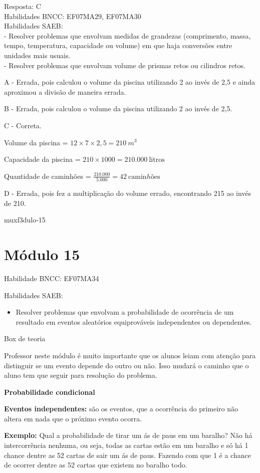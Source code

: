 {Resposta: C\\
Habilidades BNCC: EF07MA29, EF07MA30\\
Habilidades SAEB:\\
- Resolver problemas que envolvam medidas de grandezas (comprimento,
massa, tempo, temperatura, capacidade ou volume) em que haja conversões
entre unidades mais usuais.\\
- Resolver problemas que envolvam volume de prismas retos ou cilindros
retos.

A - Errada, pois calculou o volume da piscina utilizando 2 ao invés de
2,5 e ainda aproximou a divisão de maneira errada.

B - Errada, pois calculou o volume da piscina utilizando 2 ao invés de
2,5.

C - Correta.

Volume da piscina = \(12 \times 7 \times 2,5 = 210\ m^{3}\ \)

Capacidade da piscina = \(210 \times 1000 = 210.000\ \text{litros}\)

Quantidade de caminhões =
\(\frac{210.000}{5.000} = 42\ \text{camin}hõ\text{es}\)

D - Errada, pois fez a multiplicação do volume errado, encontrando 215
ao invés de 210.

muxf3dulo-15}{%
\section{Módulo 15}

Habilidade BNCC: EF07MA34

Habilidades SAEB:

\begin{itemize}
\tightlist
\item
  Resolver problemas que envolvam a probabilidade de ocorrência de um
  resultado em eventos aleatórios equiprováveis independentes ou
  dependentes.
\end{itemize}

Box de teoria

Professor neste módulo é muito importante que os alunos leiam com
atenção para distinguir se um evento depende do outro ou não. Isso
mudará o caminho que o aluno tem que seguir para resolução do problema.

\textbf{{Probabilidade condicional}}

\textbf{Eventos independentes:} são os eventos, que a ocorrência do
primeiro não altera em nada que o próximo evento ocorra.

\textbf{Exemplo:} Qual a probabilidade de tirar um ás de paus em um
baralho? Não há intercorrência nenhuma, ou seja, todas as cartas estão
em um baralho e só há 1 chance dentre as 52 cartas de sair um ás de
paus. Fazendo com que 1 é a chance de ocorrer dentre as 52 cartas que
existem no baralho todo.

}
